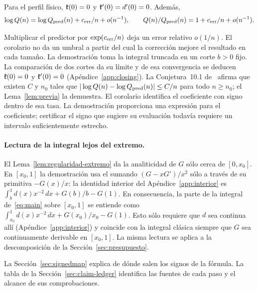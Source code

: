 \begin{corolario}\label{cor:derivada}
Para el perfil físico, $\mathfrak{k}(0)=0$ y $\mathfrak{k}'(0)=d'(0)=0$. Además,
\[
 \log Q(n)=\log Q_{\rm pred}(n)+c_{\mathrm{err}}/n+o(n^{-1}),\qquad
 Q(n)/Q_{\rm pred}(n)=1+c_{\mathrm{err}}/n+o(n^{-1}).
\]
\end{corolario}
Multiplicar el predictor por \(\exp(c_{\mathrm{err}}/n)\) deja un error relativo \(o(1/n)\).
El corolario no da un umbral a partir del cual la corrección mejore el resultado en cada tamaño.
La demostración toma la integral truncada en un corte $b>0$ fijo. La comparación de dos cortes
da su límite y de esa convergencia se deducen $\mathfrak{k}(0)=0$ y $\mathfrak{k}'(0)=0$ (Apéndice~\ref{app:closing}).
La Conjetura~10.1 de~\cite{pc} afirma que existen $C$ y $n_0$ tales que
$|\log Q(n)-\log Q_{\rm pred}(n)|\le C/n$ para todo $n\ge n_0$; el Lema~\ref{lem:previa} la demuestra.
El corolario identifica el coeficiente con signo dentro de esa tasa.
La demostración proporciona una expresión para el coeficiente; certificar el signo que sugiere su
evaluación todavía requiere un intervalo suficientemente estrecho.

\paragraph{Lectura de la integral lejos del extremo.} El Lema~\ref{lem:regularidad-extremo} da la
analiticidad de $G$ sólo cerca de $[0,x_0]$. En $[x_0,1]$ la demostración usa el sumando $(G-xG')/x^2$
sólo a través de su primitiva $-G(x)/x$: la identidad interior del Apéndice~\ref{app:interior} es
$\int_b^1d(x)x^{-2}\,dx+G(b)/b-G(1)$. En consecuencia, la parte de la integral de~\eqref{eq:main} sobre
$[x_0,1]$ se entiende como $\int_{x_0}^1d(x)x^{-2}\,dx+G(x_0)/x_0-G(1)$. Esto sólo requiere que $d$ sea
continua allí (Apéndice~\ref{app:interior}) y coincide con la integral clásica siempre que $G$ sea
continuamente derivable en $[x_0,1]$. La misma lectura se aplica a la descomposición de la
Sección~\ref{sec:presupuesto}.

La Sección~\ref{sec:signedmap} explica de dónde salen los signos de la fórmula. La tabla de la
Sección~\ref{sec:claim-ledger} identifica las fuentes de cada paso y el alcance de sus comprobaciones.

